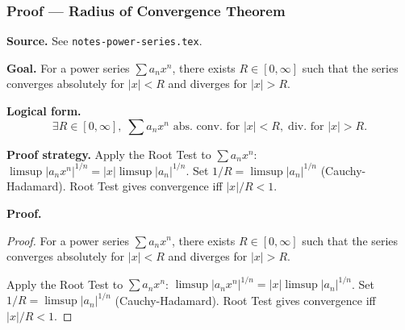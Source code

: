
\clearpage
{}
\hypertarget{proof-RA-ABB-T-radius-convergence}{}

\subsubsection[Radius of Convergence Theorem]{Proof --- Radius of Convergence Theorem}

\bigskip

\noindent
\textbf{Source.} See \texttt{notes-power-series.tex}.

\vspace{0.75em}

\noindent
\textbf{Goal.} For a power series $\sum a_n x^n$, there exists $R \in [0,\infty]$ such that the series converges absolutely for $|x| < R$ and diverges for $|x| > R$.

\vspace{0.75em}

\noindent
\textbf{Logical form.}
\[
  \exists R \in [0,\infty],\; \sum a_n x^n \text{ abs.\ conv.\ for } |x|<R,\; \text{div.\ for } |x|>R.
\]

\vspace{0.75em}

\noindent
\textbf{Proof strategy.} Apply the Root Test to $\sum a_n x^n$: $\limsup |a_n x^n|^{1/n} = |x| \limsup |a_n|^{1/n}$. Set $1/R = \limsup |a_n|^{1/n}$ (Cauchy-Hadamard). Root Test gives convergence iff $|x|/R < 1$.

\vspace{0.75em}

\noindent
\textbf{Proof.}
\begin{proof}
\Claim For a power series $\sum a_n x^n$, there exists $R \in [0,\infty]$ such that the series converges absolutely for $|x| < R$ and diverges for $|x| > R$.

\Given 

\Goal 

\Strategy Apply the Root Test to $\sum a_n x^n$: $\limsup |a_n x^n|^{1/n} = |x| \limsup |a_n|^{1/n}$. Set $1/R = \limsup |a_n|^{1/n}$ (Cauchy-Hadamard). Root Test gives convergence iff $|x|/R < 1$.

\medskip


\end{proof}

